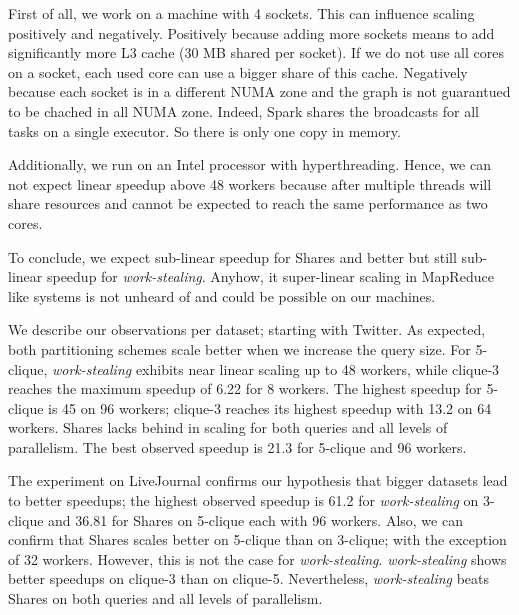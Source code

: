 First of all, we work on a machine with 4 sockets.
This can influence scaling positively and negatively.
Positively because adding more sockets means to add significantly more L3 cache (30 MB shared per socket).
If we do not use all cores on a socket, each used core can use a bigger share of this cache.
Negatively because each socket is in a different NUMA zone and the graph is not guarantued to be chached in all
NUMA zone.
Indeed, Spark shares the broadcasts for all tasks on a single executor.
So there is only one copy in memory.

Additionally, we run on an Intel processor with hyperthreading.
Hence, we can not expect linear speedup above 48 workers because after multiple threads will share resources and cannot be
expected to reach the same performance as two cores.

To conclude, we expect sub-linear speedup for Shares and better but still sub-linear speedup for \textit{work-stealing}.
Anyhow, it super-linear scaling in MapReduce like systems is not unheard of and could be possible on our machines.

We describe our observations per dataset;
starting with Twitter.
As expected, both partitioning schemes scale better when we increase the query size.
For 5-clique, \textit{work-stealing} exhibits near linear scaling up to 48 workers, while
clique-3 reaches the maximum speedup of 6.22 for 8 workers.
The highest speedup for 5-clique is 45 on 96 workers; clique-3 reaches its highest speedup
with 13.2 on 64 workers.
Shares lacks behind in scaling for both queries and all levels of parallelism.
The best observed speedup is 21.3 for 5-clique and 96 workers.

The experiment on LiveJournal confirms our hypothesis that bigger datasets lead to better
speedups;
the highest observed speedup is 61.2 for \textit{work-stealing} on 3-clique and
36.81 for Shares on 5-clique each with 96 workers.
Also, we can confirm that Shares scales better on 5-clique than on 3-clique; with the exception of 32 workers.
However, this is not the case for \textit{work-stealing}.
\textit{work-stealing} shows better speedups on clique-3 than on clique-5.
Nevertheless, \textit{work-stealing} beats Shares on both queries and all levels of parallelism.

